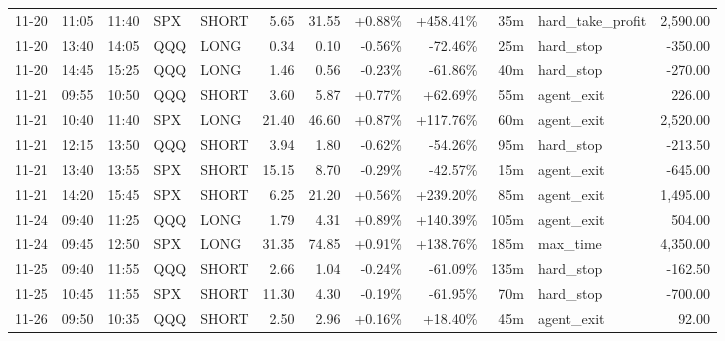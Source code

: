 \documentclass[11pt,a4paper,twoside]{article}
\begin{document}
\begin{center}
\begin{longtable}{>{\color{txtmain}}l l l l l r r r r r >{\color{txtmain}}l r}
11-20 & 11:05 & 11:40 & SPX & SHORT & 5.65 & 31.55 & \textcolor{wingreen}{+0.88\%} & \textcolor{wingreen}{+458.41\%} & 35m & hard\_take\_profit & \textcolor{wingreen}{2,590.00} \\
11-20 & 13:40 & 14:05 & QQQ & LONG & 0.34 & 0.10 & \textcolor{lossred}{-0.56\%} & \textcolor{lossred}{-72.46\%} & 25m & hard\_stop & \textcolor{lossred}{-350.00} \\
11-20 & 14:45 & 15:25 & QQQ & LONG & 1.46 & 0.56 & \textcolor{lossred}{-0.23\%} & \textcolor{lossred}{-61.86\%} & 40m & hard\_stop & \textcolor{lossred}{-270.00} \\
11-21 & 09:55 & 10:50 & QQQ & SHORT & 3.60 & 5.87 & \textcolor{wingreen}{+0.77\%} & \textcolor{wingreen}{+62.69\%} & 55m & agent\_exit & \textcolor{wingreen}{226.00} \\
11-21 & 10:40 & 11:40 & SPX & LONG & 21.40 & 46.60 & \textcolor{wingreen}{+0.87\%} & \textcolor{wingreen}{+117.76\%} & 60m & agent\_exit & \textcolor{wingreen}{2,520.00} \\
11-21 & 12:15 & 13:50 & QQQ & SHORT & 3.94 & 1.80 & \textcolor{lossred}{-0.62\%} & \textcolor{lossred}{-54.26\%} & 95m & hard\_stop & \textcolor{lossred}{-213.50} \\
11-21 & 13:40 & 13:55 & SPX & SHORT & 15.15 & 8.70 & \textcolor{lossred}{-0.29\%} & \textcolor{lossred}{-42.57\%} & 15m & agent\_exit & \textcolor{lossred}{-645.00} \\
11-21 & 14:20 & 15:45 & SPX & SHORT & 6.25 & 21.20 & \textcolor{wingreen}{+0.56\%} & \textcolor{wingreen}{+239.20\%} & 85m & agent\_exit & \textcolor{wingreen}{1,495.00} \\
11-24 & 09:40 & 11:25 & QQQ & LONG & 1.79 & 4.31 & \textcolor{wingreen}{+0.89\%} & \textcolor{wingreen}{+140.39\%} & 105m & agent\_exit & \textcolor{wingreen}{504.00} \\
11-24 & 09:45 & 12:50 & SPX & LONG & 31.35 & 74.85 & \textcolor{wingreen}{+0.91\%} & \textcolor{wingreen}{+138.76\%} & 185m & max\_time & \textcolor{wingreen}{4,350.00} \\
11-25 & 09:40 & 11:55 & QQQ & SHORT & 2.66 & 1.04 & \textcolor{lossred}{-0.24\%} & \textcolor{lossred}{-61.09\%} & 135m & hard\_stop & \textcolor{lossred}{-162.50} \\
11-25 & 10:45 & 11:55 & SPX & SHORT & 11.30 & 4.30 & \textcolor{lossred}{-0.19\%} & \textcolor{lossred}{-61.95\%} & 70m & hard\_stop & \textcolor{lossred}{-700.00} \\
11-26 & 09:50 & 10:35 & QQQ & SHORT & 2.50 & 2.96 & \textcolor{wingreen}{+0.16\%} & \textcolor{wingreen}{+18.40\%} & 45m & agent\_exit & \textcolor{wingreen}{92.00} \\

\end{longtable}
\end{center}
\end{document}
